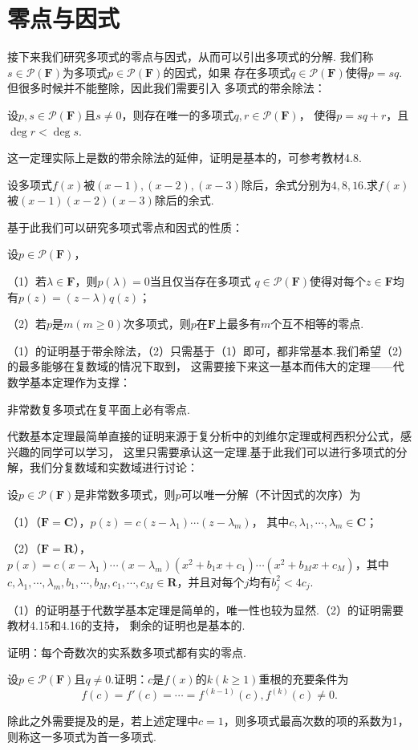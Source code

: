 \section{零点与因式}
接下来我们研究多项式的零点与因式，从而可以引出多项式的分解.
我们称$s\in\mathcal{P}(\mathbf{F})$为多项式$p\in\mathcal{P}(\mathbf{F})$的因式，如果
存在多项式$q\in\mathcal{P}(\mathbf{F})$使得$p=sq$.但很多时候并不能整除，因此我们需要引入
多项式的带余除法：
\begin{theorem}
	设$p,s\in\mathcal{P}(\mathbf{F})$且$s\neq 0$，则存在唯一的多项式$q,r\in\mathcal{P}(\mathbf{F})$，
	使得$p=sq+r$，且$\deg r<\deg s$.
\end{theorem}
这一定理实际上是数的带余除法的延伸，证明是基本的，可参考教材4.8.
\begin{example}
	设多项式$f(x)$被$(x-1),(x-2),(x-3)$除后，余式分别为$4,8,16$.求$f(x)$被$(x-1)(x-2)(x-3)$除后的余式.
\end{example}
基于此我们可以研究多项式零点和因式的性质：
\begin{theorem}
	设$p\in\mathcal{P}(\mathbf{F})$，

	\textup{（1）}若$\lambda\in\mathbf{F}$，则$p(\lambda)=0$当且仅当存在多项式
	$q\in\mathcal{P}(\mathbf{F})$使得对每个$z\in\mathbf{F}$均有$p(z)=(z-\lambda)q(z)$；

	\textup{（2）}若$p$是$m(m\ge 0)$次多项式，则$p$在$\mathbf{F}$上最多有$m$个互不相等的零点.
\end{theorem}
（1）的证明基于带余除法，（2）只需基于（1）即可，都非常基本.我们希望（2）的最多能够在复数域的情况下取到，
这需要接下来这一基本而伟大的定理——代数学基本定理作为支撑：
\begin{theorem}\label{代数学基本定理}
	非常数复多项式在复平面上必有零点.
\end{theorem}
代数基本定理最简单直接的证明来源于复分析中的刘维尔定理或柯西积分公式，感兴趣的同学可以学习，
这里只需要承认这一定理.基于此我们可以进行多项式的分解，我们分复数域和实数域进行讨论：
\begin{theorem}\label{多项式分解}
	设$p\in\mathcal{P}(\mathbf{F})$是非常数多项式，则$p$可以唯一分解（不计因式的次序）为

	\textup{（1）}（$\mathbf{F}=\mathbf{C}$），$p(z)=c(z-\lambda_1)\cdots(z-\lambda_m)$，
	其中$c,\lambda_1,\cdots,\lambda_m\in\mathbf{C}$；

	\textup{（2）}（$\mathbf{F}=\mathbf{R}$），$p(x)=c(x-\lambda_1)\cdots(x-\lambda_m)
	(x^2+b_1x+c_1)\cdots(x^2+b_Mx+c_M)$，其中$c,\lambda_1,\cdots,\lambda_m,b_1,\cdots,b_M,
	c_1,\cdots,c_M\in\mathbf{R}$，并且对每个$j$均有$b_j^2<4c_j$.
\end{theorem}
（1）的证明基于代数学基本定理是简单的，唯一性也较为显然.（2）的证明需要教材4.15和4.16的支持，
剩余的证明也是基本的.
\begin{example}
	证明：每个奇数次的实系数多项式都有实的零点.
\end{example}
\begin{example}
	设$p\in\mathcal{P}(\mathbf{F})$且$q\neq 0$.证明：$c$是$f(x)$的$k(k\ge 1)$重根的充要条件为
	$$f(c)=f'(c)=\cdots=f^{(k-1)}(c),f^{(k)}(c)\neq 0.$$
\end{example}
除此之外需要提及的是，若上述定理中$c=1$，则多项式最高次数的项的系数为1，则称这一多项式为首一多项式.

